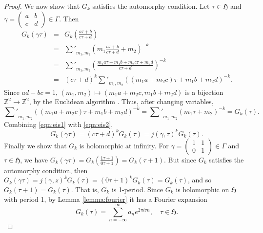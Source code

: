 \documentclass{article}
\begin{document}
\begin{proof}
We now show that $G_k$ satisfies the automorphy condition.
Let $\tau \in \mathfrak{H}$ and $\gamma=\begin{pmatrix}a&b\\c&d\end{pmatrix} \in \Gamma$. Then
\begin{eqnarray}
G_k(\gamma \tau)&=&G_k(\frac{a\tau+b}{c\tau+d})\nonumber \\
&=&{{\sum}'}_{m_1,m_2} (m_1\frac{a\tau+b}{c\tau+d}+m_2)^{-k}\nonumber \\
&=&{{\sum}'}_{m_1,m_2} (\frac{m_1a\tau+m_1b+m_2c\tau+m_2d}{c\tau+d})^{-k}\nonumber \\
&=&(c\tau+d)^k {{\sum}'}_{m_1,m_2}((m_1a+m_2c)\tau+m_1b+m_2d)^{-k}\label{eqn:eis1}.
\end{eqnarray}
Since $ad-bc=1$, $(m_1,m_2) \mapsto (m_1a+m_2c,m_1b+m_2d)$ is a bijection
$\mathbb{Z}^2 \to \mathbb{Z}^2$, by the Euclidean algorithm \cite[\S 12.3]{MR568909}. Thus, after changing variables,
\begin{equation}
\label{eqn:eis2}
{{\sum}'}_{m_1,m_2}((m_1a+m_2c)\tau+m_1b+m_2d)^{-k}={{\sum}'}_{m_1,m_2}(m_1\tau+m_2)^{-k}=G_k(\tau).
\end{equation}
Combining \eqref{eqn:eis1} with \eqref{eqn:eis2},
\[
G_k(\gamma \tau)=(c\tau+d)^kG_k(\tau)=j(\gamma,\tau)^kG_k(\tau).
\]
Finally we show that $G_k$ is holomorphic at infinity.
For $\gamma=\begin{pmatrix}1&1\\0&1\end{pmatrix} \in \Gamma$ and $\tau \in \mathfrak{H}$, we have
$G_k(\gamma \tau)=G_k(\frac{1\tau+1}{0\tau+1})=G_k(\tau+1)$. But since $G_k$ satisfies the automorphy condition,
then $G_k(\gamma \tau)=j(\gamma,z)^kG_k(\tau)=(0\tau+1)^kG_k(\tau)=G_k(\tau)$, and so $G_k(\tau+1)=G_k(\tau)$. That is,
$G_k$ is  1-period.
Since $G_k$ is holomorphic on $\mathfrak{H}$ with period 1, by Lemma \ref{lemma:fourier} it has a Fourier expansion 
\[
G_k(\tau)=\sum_{n=-\infty}^\infty a_n e^{2\pi i\tau n}, \quad \tau \in \mathfrak{H}.
\]


\end{proof}
\end{document}
